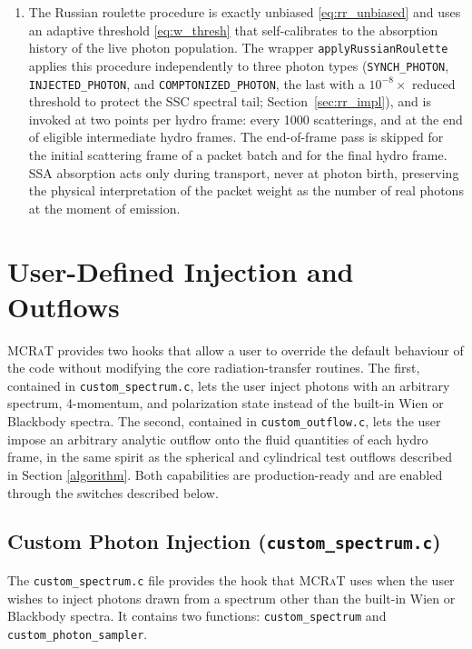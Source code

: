\documentclass[12pt,a4paper]{article}
\newcommand{\code}[1]{\texttt{#1}}
\newcommand{\mcrat}{\textsc{MCRaT}}
\begin{document}
\begin{enumerate}
	\item The Russian roulette procedure is exactly unbiased
	\eqref{eq:rr_unbiased} and uses an adaptive threshold
	\eqref{eq:w_thresh} that self-calibrates to the absorption history of
	the live photon population. The wrapper \code{applyRussianRoulette}
	applies this procedure independently to three photon types
	(\code{SYNCH\_PHOTON}, \code{INJECTED\_PHOTON}, and
	\code{COMPTONIZED\_PHOTON}, the last with a $10^{-8}\times$ reduced
	threshold to protect the SSC spectral tail; Section~\ref{sec:rr_impl}),
	and is invoked at two points per hydro frame: every 1000 scatterings, and at the end of eligible intermediate hydro
	frames. The end-of-frame pass is skipped for the initial scattering frame
	of a packet batch and for the final hydro frame. SSA absorption acts only during transport,
	never at photon birth, preserving the physical interpretation of the
	packet weight as the number of real photons at the moment of emission.
\end{enumerate}

\section{User-Defined Injection and Outflows}\label{custom}
\mcrat{} provides two hooks that allow a user to override the default behaviour of the code without modifying the core radiation-transfer routines. The first, contained in \texttt{custom\_spectrum.c}, lets the user inject photons with an arbitrary spectrum, 4-momentum, and polarization state instead of the built-in Wien or Blackbody spectra. The second, contained in \texttt{custom\_outflow.c}, lets the user impose an arbitrary analytic outflow onto the fluid quantities of each hydro frame, in the same spirit as the spherical and cylindrical test outflows described in Section \ref{algorithm}. Both capabilities are production-ready and are enabled through the switches described below.

\subsection{Custom Photon Injection (\texttt{custom\_spectrum.c})}\label{custom_spectrum}
The \texttt{custom\_spectrum.c} file provides the hook that \mcrat{} uses when the user wishes to inject photons drawn from a spectrum other than the built-in Wien or Blackbody spectra. It contains two functions: \texttt{custom\_spectrum} and \texttt{custom\_photon\_sampler}.
\end{document}
